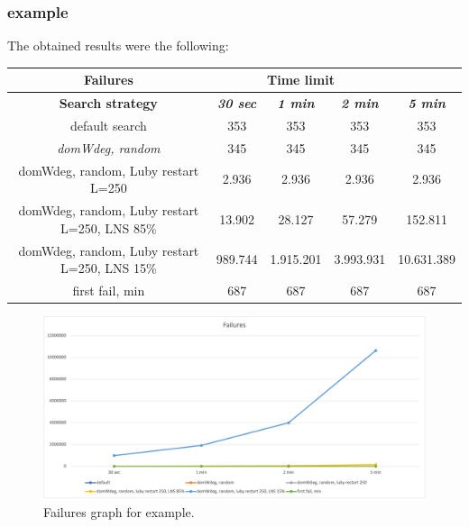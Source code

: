\subsubsection{example}
The obtained results were the following:
{
\renewcommand{\arraystretch}{2}
\begin{longtable}[h]{| c | c | c | c | c |}
    \hline
    \textbf{Failures} & \multicolumn{3}{c}{Time limit} & \\
    \hline
    \textbf{Search strategy} & \textbf{\textit{30 sec}} & \textbf{\textit{1 min}} & \textbf{\textit{2 min}} & \textbf{\textit{5 min}} \\
    \hline
    \endhead
    default search                                &    353 &     353 &     353 &      353 \\
    \hline
    \textit{domWdeg, random}                      &    345 &     345 &     345 &      345 \\
    \hline
    domWdeg, random, Luby restart L=250           &   2.936 &    2.936 &    2.936 &     2.936 \\
    \hline
    domWdeg, random, Luby restart L=250, LNS 85\% &  13.902 &   28.127 &   57.279 &   152.811 \\
    \hline
    domWdeg, random, Luby restart L=250, LNS 15\% & 989.744 & 1.915.201 & 3.993.931 & 10.631.389 \\
    \hline
    first fail, min                               &    687 &     687 &     687 &      687 \\
    \hline
\end{longtable}
}
\begin{figure}[H]
    \centering
    \includegraphics[width=1.0\columnwidth]{../graphs/example-failures.png}
    \caption{Failures graph for example.}
\end{figure}

